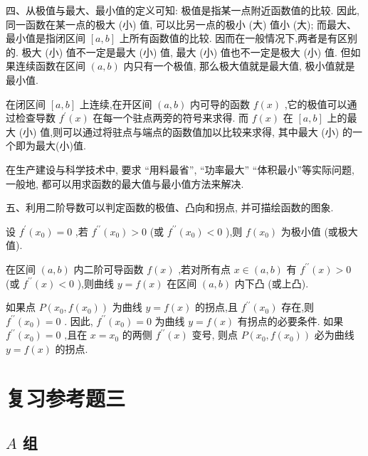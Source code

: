 \documentclass[lang=cn,newtx,10pt,scheme=chinese]{elegantbook}
\begin{document}
四、从极值与最大、最小值的定义可知: 极值是指某一点附近函数值的比较. 因此, 同一函数在某一点的极大 (小) 值, 可以比另一点的极小 (大) 值小 (大); 而最大、最小值是指闭区间 \(\left\lbrack {a,b}\right\rbrack\) 上所有函数值的比较. 因而在一般情况下,两者是有区别的. 极大 (小) 值不一定是最大 (小) 值, 最大 (小) 值也不一定是极大 (小) 值. 但如果连续函数在区间 \(\left( {a,b}\right)\) 内只有一个极值, 那么极大值就是最大值, 极小值就是最小值.

在闭区间 \(\left\lbrack {a,b}\right\rbrack\) 上连续,在开区间 \(\left( {a,b}\right)\) 内可导的函数 \(f\left( x\right)\) ,它的极值可以通过检查导数 \({f}^{\prime }\left( x\right)\) 在每一个驻点两旁的符号来求得. 而 \(f\left( x\right)\) 在 \(\left\lbrack {a,b}\right\rbrack\) 上的最大 (小) 值,则可以通过将驻点与端点的函数值加以比较来求得, 其中最大 (小) 的一个即为最大(小)值.

在生产建设与科学技术中, 要求 “用料最省”, “功率最大” “体积最小”等实际问题, 一般地, 都可以用求函数的最大值与最小值方法来解决.

五、利用二阶导数可以判定函数的极值、凸向和拐点, 并可描绘函数的图象.

设 \({f}^{\prime }\left( {x}_{0}\right) = 0\) ,若 \({f}^{\prime \prime }\left( {x}_{0}\right) > 0\) (或 \({f}^{\prime \prime }\left( {x}_{0}\right) < 0\) ),则 \(f\left( {x}_{0}\right)\) 为极小值 (或极大值).

在区间 \(\left( {a,b}\right)\) 内二阶可导函数 \(f\left( x\right)\) ,若对所有点 \(x \in \left( {a,b}\right)\) 有 \({f}^{\prime \prime }\left( x\right) > 0\) (或 \({f}^{\prime \prime }\left( x\right) < 0\) ),则曲线 \(y = f\left( x\right)\) 在区间 \(\left( {a,b}\right)\) 内下凸 (或上凸).

如果点 \(P\left( {{x}_{0},f\left( {x}_{0}\right) }\right)\) 为曲线 \(y = f\left( x\right)\) 的拐点,且 \({f}^{\prime \prime }\left( {x}_{0}\right)\) 存在,则 \({f}^{\prime \prime }\left( {x}_{0}\right) = 0\) . 因此, \({f}^{\prime \prime }\left( {x}_{0}\right) = 0\) 为曲线 \(y = f\left( x\right)\) 有拐点的必要条件. 如果 \({f}^{\prime \prime }\left( {x}_{0}\right) = 0\) ,且在 \(x = {x}_{0}\) 的两侧 \({f}^{\prime \prime }\left( x\right)\) 变号, 则点 \(P\left( {{x}_{0},f\left( {x}_{0}\right) }\right)\) 必为曲线 \(y = f\left( x\right)\) 的拐点.

\chapter*{复习参考题三}

\section*{\(A\) 组}
\end{document}
